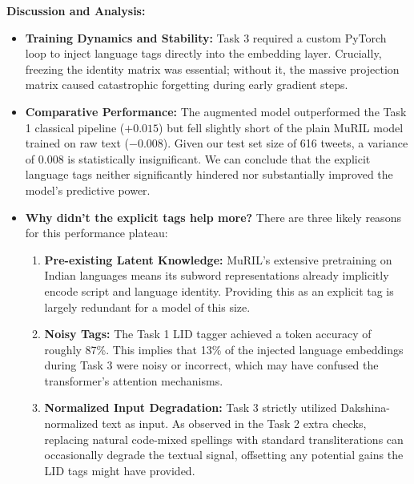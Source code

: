 \textbf{Discussion and Analysis:}
\begin{itemize}
    \item \textbf{Training Dynamics and Stability:} Task 3 required a custom PyTorch loop to inject language tags directly into the embedding layer. Crucially, freezing the identity matrix was essential; without it, the massive projection matrix caused catastrophic forgetting during early gradient steps.
    
    \item \textbf{Comparative Performance:} The augmented model outperformed the Task 1 classical pipeline ($+0.015$) but fell slightly short of the plain MuRIL model trained on raw text ($-0.008$). Given our test set size of 616 tweets, a variance of 0.008 is statistically insignificant. We can conclude that the explicit language tags neither significantly hindered nor substantially improved the model's predictive power.
    
    \item \textbf{Why didn't the explicit tags help more?} There are three likely reasons for this performance plateau:
    \begin{enumerate}
        \item \textbf{Pre-existing Latent Knowledge:} MuRIL's extensive pretraining on Indian languages means its subword representations already implicitly encode script and language identity. Providing this as an explicit tag is largely redundant for a model of this size.
        \item \textbf{Noisy Tags:} The Task 1 LID tagger achieved a token accuracy of roughly 87\%. This implies that 13\% of the injected language embeddings during Task 3 were noisy or incorrect, which may have confused the transformer's attention mechanisms.
        \item \textbf{Normalized Input Degradation:} Task 3 strictly utilized Dakshina-normalized text as input. As observed in the Task 2 extra checks, replacing natural code-mixed spellings with standard transliterations can occasionally degrade the textual signal, offsetting any potential gains the LID tags might have provided.
    \end{enumerate}
\end{itemize}